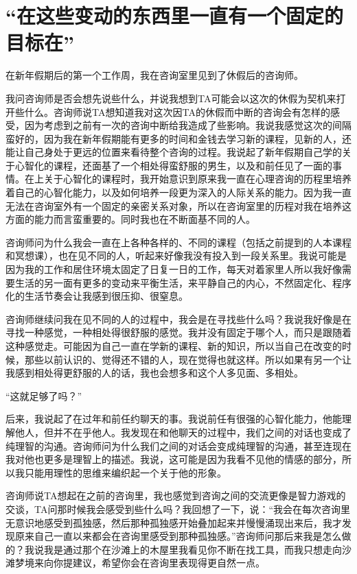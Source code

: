 \chapter{“在这些变动的东西里一直有一个固定的目标在”}



在新年假期后的第一个工作周，我在咨询室里见到了休假后的咨询师。

我问咨询师是否会想先说些什么，并说我想到TA可能会以这次的休假为契机来打开些什么。咨询师说TA想知道我对这次因TA的休假而中断的咨询会有怎样的感受，因为考虑到之前有一次的咨询中断给我造成了些影响。我说我感觉这次的间隔蛮好的，因为我在新年假期能有更多的时间和金钱去学习新的课程，见新的人，还能让自己身处于更远的位置来看待整个咨询的过程。我说起了新年假期自己学的关于心智化的课程，还面基了一个相处得蛮舒服的男生，以及和前任见了一面的事情。在上关于心智化的课程时，我开始意识到原来我一直在心理咨询的历程里培养着自己的心智化能力，以及如何培养一段更为深入的人际关系的能力。因为我一直无法在咨询室外有一个固定的亲密关系对象，所以在咨询室里的历程对我在培养这方面的能力而言蛮重要的。同时我也在不断面基不同的人。

咨询师问为什么我会一直在上各种各样的、不同的课程（包括之前提到的人本课程和冥想课），也在见不同的人，听起来好像我没有投入到一段关系里。我说可能是因为我的工作和居住环境太固定了\pozhehao{}日复一日的工作，每天对着家里人\pozhehao{}所以我好像需要生活的另一面有更多的变动来平衡生活，来平静自己的内心，不然固定化、程序化的生活节奏会让我感到很压抑、很窒息。

咨询师继续问我在见不同的人的过程中，我会是在寻找些什么吗？我说我好像是在寻找一种感觉，一种相处得很舒服的感觉。我并没有固定于哪个人，而只是跟随着这种感觉走。可能因为自己一直在学新的课程、新的知识，所以当自己在改变的时候，那些以前认识的、觉得还不错的人，现在觉得也就这样。所以如果有另一个让我感到相处得更舒服的人的话，我也会想多和这个人多见面、多相处。


“这就足够了吗？”

后来，我说起了在过年和前任约聊天的事。我说前任有很强的心智化能力，他能理解他人，但并不在乎他人。我发现在和他聊天的过程中，我们之间的对话也变成了纯理智的沟通。咨询师问为什么我们之间的对话会变成纯理智的沟通，甚至连现在我对他也更多是理智上的描述。我说，这可能是因为我看不见他的情感的部分，所以我只能用理性的思维来编织起一个关于他的形象。

咨询师说TA想起在之前的咨询里，我也感觉到咨询之间的交流更像是智力游戏的交谈，TA问那时候我会感受到些什么吗？我回想了一下，说：“我会在每次咨询里无意识地感受到孤独感，然后那种孤独感开始叠加起来并慢慢涌现出来后，我才发现原来自己一直以来都会在咨询里感受到那种孤独感。”咨询师问那后来我是怎么做的？我说我是通过那个\pozhehao{}在沙滩上的木屋里我看见你不断在找工具，而我只想走向沙滩\pozhehao{}梦境来向你提建议，希望你会在咨询里表现得更自然一点。

